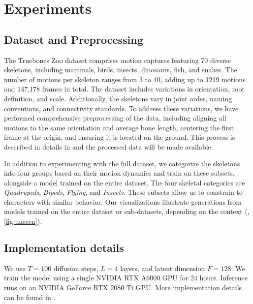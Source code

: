 \section{Experiments}\label{sec:experiments}
\ifarxiv

\fi
\subsection{Dataset and Preprocessing} \label{sec:dataset}

The Truebones Zoo \cite{truebones} dataset comprises motion captures featuring 70 diverse skeletons, including mammals, birds, insects, dinosaurs, fish, and snakes. 
The number of motions per skeleton ranges from 3 to 40,
adding up to 1219 motions and 147,178 frames in total. 
The dataset includes variations in orientation, root definition, and scale. 
Additionally, the skeletons vary in joint order, naming conventions, and connectivity standards. 
To address these variations, we have performed comprehensive preprocessing of the data, including aligning all motions to the same orientation and average bone length, centering the first frame at the origin, and ensuring it is located on the ground.
This process is described in details in  and the processed data will be made available.






In addition to experimenting with the full dataset, 
we categorize the skeletons into four groups based on their motion dynamics and train \algoname on these subsets, alongside a model trained on the entire dataset.
The four skeletal categories are \emph{Quadrupeds}, \emph{Bipeds}, \emph{Flying}, and \emph{Insects}. 
These subsets allow us to constrain \crossgen to characters with similar behavior.
Our visualizations illustrate generations from models trained on the entire dataset or sub-datasets, depending on the context (\eg, \cref{fig:unseen}). 



\subsection{Implementation details}
We use $T=100$ diffusion steps, $L=4$ \stt layers, and latent dimension $F=128$. 
We train the model using a single NVIDIA RTX A6000 GPU for 24 hours. Inference runs on an NVIDIA GeForce RTX 2080 Ti GPU. More implementation details can be found in .

